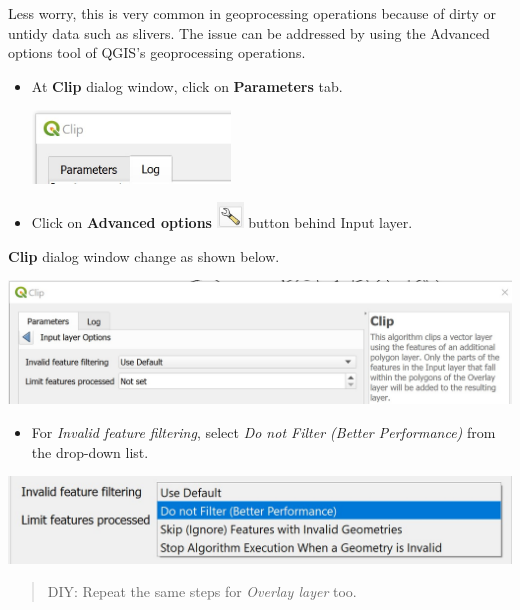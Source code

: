 \documentclass[
  letterpaper,
  DIV=11,
  numbers=noendperiod]{scrreprt}
\providecommand{\tightlist}{%
  \setlength{\itemsep}{0pt}\setlength{\parskip}{0pt}}\usepackage{longtable,booktabs,array}
\begin{document}
Less worry, this is very common in geoprocessing operations because of
dirty or untidy data such as slivers. The issue can be addressed by
using the Advanced options tool of QGIS's geoprocessing operations.

\begin{itemize}
\item
  At \textbf{Clip} dialog window, click on \textbf{Parameters} tab.

  \includegraphics[width=2.07292in,height=\textheight]{./img04/image25.jpg}
\item
  Click on \textbf{Advanced options}
  \includegraphics[width=0.28125in,height=\textheight]{./img04/image22.jpg}
  button behind Input layer.
\end{itemize}

\textbf{Clip} dialog window change as shown below.

\includegraphics{./images/paste-21713C8F.png}

\begin{itemize}
\tightlist
\item
  For \emph{Invalid feature filtering}, select \emph{Do not Filter
  (Better Performance)} from the drop-down list.
\end{itemize}

\includegraphics{./img04/image27.jpg}

\begin{quote}
DIY: Repeat the same steps for \emph{Overlay layer} too.
\end{quote}
\end{document}
